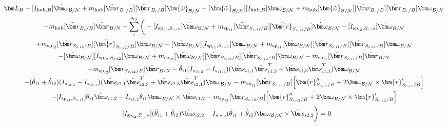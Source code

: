 \begin{multline}
	\bm L_B -[I_{\text{hub},B}] \dot{\bm\omega}_{\cal B/N} + m_{\text{hub}} [\tilde{{\bm r}}_{B_c/B}] [\tilde{{\bm r}}_{B_c/B}] \bm{\dot{\omega}}_{\cal B/N} -[\bm{\tilde{\omega}}_{\cal B/N}] [I_{\text{hub},B}] \bm\omega_{\cal B/N} + m_{\text{hub}} [\bm{\tilde{\omega}}_{\cal B/N}] [\tilde{{\bm r}}_{B_c/B}] [\tilde{{\bm r}}_{B_c/B}]\bm\omega_{\cal B/N} \\
	- m_{\text{hub}} [\tilde{{\bm r}}_{B_c/B}] \ddot{\bm r}_{B/N}
	+ \sum\limits_{i}^{N_S}\bigg(-[I_{\text{sp}_{i1},S_{c,i1}}] \dot{\bm \omega}_{\cal{B/N}} + m_{\text{sp}_{i1}} [\tilde{{\bm r}}_{S_{c,i1}/B}] [\tilde{\bm{r}}_{S_{c,i1}/B}] \dot{\bm\omega}_{\cal B/N} -[I_{\text{sp}_{i2},S_{c,i2}}] \dot{\bm \omega}_{\cal{B/N}} \\
	+ m_{\text{sp}_{i2}} [\tilde{{\bm r}}_{S_{c,i2}/B}] [\tilde{\bm{r}}_{S_{c,i2}/B}] \dot{\bm\omega}_{\cal B/N}
	-[\tilde{\bm \omega}_{\cal{B/N}}] [I_{\text{sp}_{i1},S_{c,i1}}] \bm \omega_{\cal{B/N}}
	+ m_{\text{sp}_{i1}} [\tilde{\bm \omega}_{\cal{B/N}}] [\tilde{{\bm r}}_{S_{c,i1}/B}] [\tilde{{\bm r}}_{S_{c,i1}/B}] \bm\omega_{\cal B/N}
	\\
	-[\tilde{\bm \omega}_{\cal{B/N}}] [I_{\text{sp}_{i2},S_{c,i2}}] \bm \omega_{\cal{B/N}} + m_{\text{sp}_{i2}} [\tilde{\bm \omega}_{\cal{B/N}}] [\tilde{{\bm r}}_{S_{c,i2}/B}] [\tilde{{\bm r}}_{S_{c,i2}/B}] \bm\omega_{\cal B/N}
	- m_{\text{sp}_{i1}} [\tilde{{\bm r}}_{S_{c,i1}/B}] \ddot{\bm r}_{B/N}\\
	- m_{\text{sp}_{i2}} [\tilde{{\bm r}}_{S_{c,i2}/B}] \ddot{\bm r}_{B/N}
	-\dot{\theta}_{i1} (I_{s_{i1,3}} - I_{s_{i1,1}})( \hat{\bm s}_{i1,1} \hat{\bm s}_{i1,3}^T + \hat{\bm s}_{i1,3} \hat{\bm s}_{i1,1}^T) \bm \omega_{\cal{B/N}} \\
	-(\dot{\theta}_{i1}  + \dot{\theta}_{i2})(I_{s_{i2,3}} - I_{s_{i2,1}}) (\hat{\bm s}_{i2,1} \hat{\bm s}_{i2,3}^T + \hat{\bm s}_{i2,3} \hat{\bm s}_{i2,1}^T) \bm \omega_{\cal{B/N}}
	- m_{\text{sp}_{i1}} [\tilde{{\bm r}}_{S_{c,i1}/B}] \Big[\bm{r}''_{S_{c,i1}/B} + 2 \bm\omega_{\cal B/N} \times \bm{r}'_{S_{c,i1}/B}\Big]
	\\
	-[I_{\text{sp}_{i1},S_{c,i1}}] \ddot{\theta}_{i1} \hat{\bm s}_{i1,2}
	-I_{s_{i1,2}} \dot{\theta}_{i1} \bm \omega_{\cal{B/N}} \times \hat{\bm s}_{i1,2}
	- m_{\text{sp}_{i2}} [\tilde{{\bm r}}_{S_{c,i2}/B}] \Big[ \bm{r}''_{S_{c,i2}/B} + 2 \bm\omega_{\cal B/N} \times \bm{r}'_{S_{c,i2}/B}\Big]
	\\
	-[I_{\text{sp}_{i2},S_{c,i2}}] (\ddot{\theta}_{i1}  + \ddot{\theta}_{i2})\hat{\bm s}_{i2,2}
	-I_{s_{i2,2}}  (\dot{\theta}_{i1}  + \dot{\theta}_{i2}) \bm \omega_{\cal{B/N}} \times \hat{\bm s}_{i2,2} \bigg) = 0
\end{multline}

